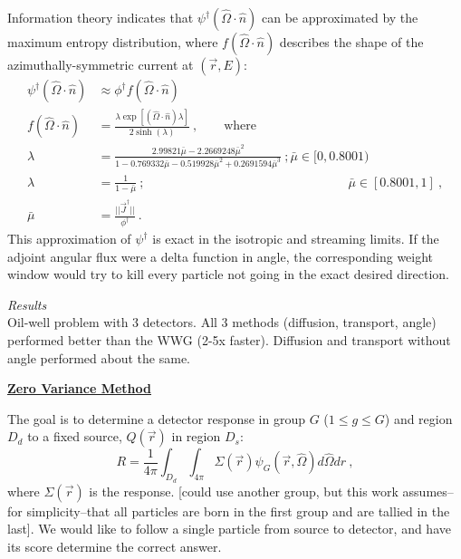 \documentclass[12pt,twoside]{article}
\newcommand{\vOmega}{\ensuremath{\hat{\Omega}}}
\begin{document}
Information theory indicates that $\psi^{\dagger}(\vOmega \cdot \hat{n})$ can be approximated by the maximum entropy distribution, where $f(\vOmega \cdot \hat{n})$ describes the shape of the azimuthally-symmetric current at $(\vec{r}, E)$:
\begin{align}
  \psi^{\dagger}(\vOmega \cdot \hat{n}) &\approx \phi^{\dagger} f(\vOmega \cdot \hat{n}) \\
  f(\vOmega \cdot \hat{n}) &= \frac{\lambda \exp[(\vOmega \cdot \hat{n})\lambda]}{2 \sinh(\lambda)} \:, \qquad \text{where} \\
  \lambda &= \frac{2.99821 \bar{\mu} - 2.2669248 \bar{\mu}^2}{1 - 0.769332 \bar{\mu} - 0.519928\bar{\mu}^2 + 0.2691594\bar{\mu}^3} \:; \bar{\mu} \in [0, 0.8001) \\
   \lambda &= \frac{1}{1 - \bar{\mu}} \:; \qquad \qquad \qquad \qquad \qquad \qquad \qquad \qquad \bar{\mu} \in [0.8001, 1] \:, \\
   \bar{\mu} &=  \frac{||\vec{J}^{\dagger}||}{\phi^{\dagger}}\:.
\end{align}
This approximation of $\psi^{\dagger}$ is exact in the isotropic and streaming limits. If the adjoint angular flux were a delta function in angle, the corresponding weight window would try to kill every particle not going in the exact desired direction.  

\vspace*{1em}
\noindent \textit{Results}\\
Oil-well problem with 3 detectors. All 3 methods (diffusion, transport, angle) performed better than the WWG (2-5x faster). Diffusion and transport without angle performed about the same. 

\vspace*{3em}
\begin{center}
\underline{\textbf{Zero Variance Method}} \cite{Turner1997a}
\end{center}
The goal is to determine a detector response in group $G$ ($1 \leq g \leq G$) and region $D_d$ to a fixed source, $Q(\vec{r})$ in region $D_s$:
\begin{equation}
  R = \frac{1}{4 \pi} \int_{D_d} \int_{4\pi} \Sigma(\vec{r})\psi_{G}(\vec{r}, \vOmega) d\vOmega dr \:,
\end{equation}
where $\Sigma(\vec{r})$ is the response. [could use another group, but this work assumes--for simplicity--that all particles are born in the first group and are tallied in the last]. We would like to follow a single particle from source to detector, and have its score determine the correct answer.
\end{document}

